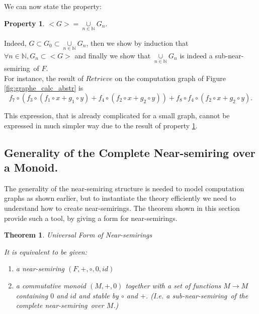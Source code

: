 \documentclass[11pt,a4paper]{article}
\newcommand{\bb}[1]{\mathbb{#1}}
\newcommand{\N}{\bb{N}}
\newcommand{\Ns}{near-semiring}
\newcommand{\sns}{sub-near-semiring}
\newtheorem{theorem}{Theorem}
\newtheorem{property}{Property}
\theoremstyle{definition}
\begin{document}
	We can now state the property:
	\begin{property}
	\label{prop:sns_generated}
		$<G> = \underset{n \in \N}{\cup} G_n$. 
	\end{property}
		
	Indeed, $G \subset G_0 \subset \underset{n \in \N}{\cup} G_n$, then we show by induction that $\forall n \in \N, G_n \subset <G>$ and finally we show that $\underset{n \in \N}{\cup} G_n$ is indeed a \sns\ of $F$.\\
	
	For instance, the result of $Retrieve$ on the computation graph of Figure \ref{fig:graphe_calc_abstr} is 
	$$f_7 \circ (f_3 \circ (f_1 \circ x + g_1 \circ y) + f_4 \circ (f_2 \circ x + g_2 \circ y) ) + f_8 \circ f_4 \circ (f_2 \circ x + g_2 \circ y).$$
	
	This expression, that is already complicated for a small graph, cannot be expressed in much simpler way due to the result of property \ref{prop:sns_generated}.
	
\subsection{Generality of the Complete Near-semiring over a Monoid.}

	The generality of the near-semiring structure is needed to model computation graphs as shown earlier, but to instantiate the theory efficiently we need to understand how to create near-semirings. The theorem shown in this section provide such a tool, by giving a form for near-semirings.

\begin{theorem}{Universal Form of Near-semirings}
\label{thm:near_semirings_fun_monoids}

	It is equivalent to be given:

	\begin{enumerate}

		\item a near-semiring $(F,+,\circ,0,id)$

		\item a commutative monoid $(M,+,0)$ together with a set of functions $M \to M$ containing $0$ and $id$ and stable by $\circ$ and $+$. (I.e. a \sns\ of the complete \Ns\ over $M$.)

	\end{enumerate}

\end{theorem}
\end{document}
